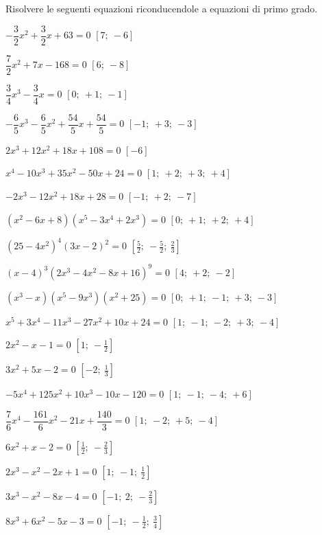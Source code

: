 \begin{esercizio}[\Ast]
\label{ese:20.9}
Risolvere le seguenti equazioni riconducendole a equazioni di primo grado.
\begin{enumeratea}
 \item $-{\dfrac{3}{2}}x^{2}+\dfrac{3}{2}x+63=0$ \hfill $\left[7;~-6\right]$
 \item $\dfrac{7}{2}x^{2}+7x-168=0$ \hfill $\left[6;~-8\right]$
 \item $\dfrac{3}{4}x^{3}-\dfrac{3}{4}x=0$ \hfill $\left[0;~+1;~-1\right]$
 \item $-{\dfrac{6}{5}}x^{3}-\dfrac{6}{5}x^{2}+\dfrac{54}{5}x+\dfrac{54}{5}=0$ 
  \hfill $\left[-1;~+3;~-3\right]$
 \item $2x^{3}+12x^{2}+18x+108=0$ \hfill $\left[-6\right]$
 \item $x^{4}-10x^{3}+35x^{2}-50x+24=0$ \hfill $\left[1;~+2;~+3;~+4\right]$
 \item $-2x^{3}-12x^{2}+18x+28=0$ \hfill $\left[-1;~+2;~-7\right]$
 \item $(x^{2}-6x+8)(x^{5}-3x^{4}+2x^{3})=0$ 
  \hfill $\left[0;~+1;~+2;~+4\right]$
 \item $\left(25-4x^{2}\right)^{4}\left(3x-2\right)^{2}=0$ 
  \hfill $\left[\frac{5}{2};~-\frac{5}{2};~\frac{2}{3}\right]$
 \item $(x-4)^{3}\left(2x^{3}-4x^{2}-8x+16\right)^{9}=0$ 
  \hfill $\left[4;~+2;~-2\right]$
 \item $(x^{3}-x)(x^{5}-9x^{3})(x^{2}+25)=0$ 
  \hfill $\left[0;~+1;~-1;~+3;~-3\right]$
 \item $x^{5}+3x^{4}-11x^{3}-27x^{2}+10x+24=0$ 
  \hfill $\left[1;~-1;~-2;~+3;~-4\right]$
 \item $2x^{2}-x-1=0$ \hfill $\left[1;~-\frac{1}{2}\right]$
 \item $3x^{2}+5x-2=0$ \hfill $\left[-2;~\frac{1}{3}\right]$
 \item $-5x^{4}+125x^{2}+10x^{3}-10x-120=0$ \hfill $\left[1;~-1;~-4;~+6\right]$
 \item $\dfrac{7}{6}x^{4}-\dfrac{161}{6}x^{2}-21x+\dfrac{140}{3}=0$ 
  \hfill $\left[1;~-2;~+5;~-4\right]$
 \item $6x^{2}+x-2=0$ \hfill $\left[\frac{1}{2};~-\frac{2}{3}\right]$
 \item $2x^{3}-x^{2}-2x+1=0$ \hfill $\left[1;~-1;~\frac{1}{2}\right]$
 \item $3x^{3}-x^{2}-8x-4=0$ \hfill $\left[-1;~2;~-\frac{2}{3}\right]$
 \item $8x^{3}+6x^{2}-5x-3=0$ 
  \hfill $\left[-1;~-\frac{1}{2};~\frac{3}{4}\right]$

\end{enumeratea}
\end{esercizio}
